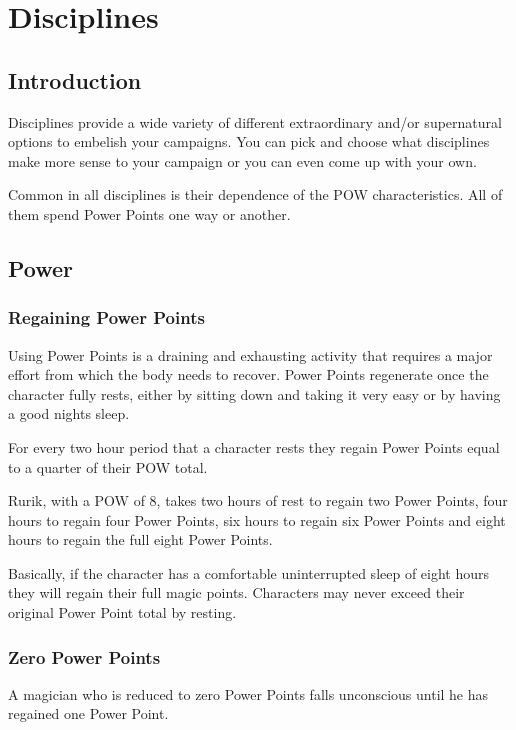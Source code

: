 \chapter{Disciplines}
\label{ch:disciplines}

\section{Introduction}
Disciplines provide a wide variety of different extraordinary and/or supernatural options to embelish your campaigns. You can pick and choose what disciplines make more sense to your campaign or you can even come up with your own.

Common in all disciplines is their dependence of the POW characteristics. All of them spend Power Points one way or another.

\section{Power}

\subsection{Regaining Power Points}
Using Power Points is a draining and exhausting activity that requires a major effort from which the body needs to recover. Power Points regenerate once the character fully rests, either by sitting down and taking it very easy or by having a good nights sleep. 

For every two hour period that a character rests they regain Power Points equal to a quarter of their POW total.  

\begin{rpg-examplebox}
Rurik, with a POW of 8, takes two hours of rest to regain two Power Points, four hours to regain four Power Points, six hours to regain six Power Points and eight hours to regain the full eight Power Points. 
\end{rpg-examplebox}

Basically, if the character has a comfortable uninterrupted sleep of eight hours they will regain their full magic points. Characters may never exceed their original Power Point total by resting.

\subsection{Zero Power Points}
A magician who is reduced to zero Power Points falls unconscious until he has regained one Power Point.

